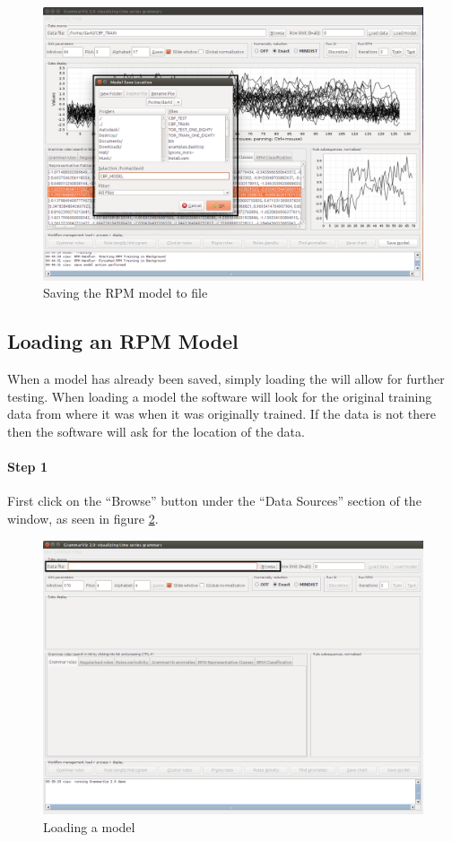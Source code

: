 \documentclass[letterpaper, 12pt]{article}
\begin{document}
\begin{figure}[H]
	\includegraphics[width=\textwidth]{TSAT-save-model-step-2}
	\caption{Saving the RPM model to file}
	\label{fig:TSAT-save-model-step-2}
\end{figure}

\newpage
\subsection{Loading an RPM Model}
\label{RPMLoading}
When a model has already been saved, simply loading the will allow for further testing. When loading a model the software will look for the original training data from where it was when it was originally trained. If the data is not there then the software will ask for the location of the data.

\paragraph{Step 1}
First click on the ``Browse'' button under the ``Data Sources'' section of the window, as seen in figure \ref{fig:TSAT-load-model-step-1}. 

\begin{figure}[h]
	\includegraphics[width=\textwidth]{TSAT-load-model-step-1}
	\caption{Loading a model}
	\label{fig:TSAT-load-model-step-1}
\end{figure}
\end{document}
